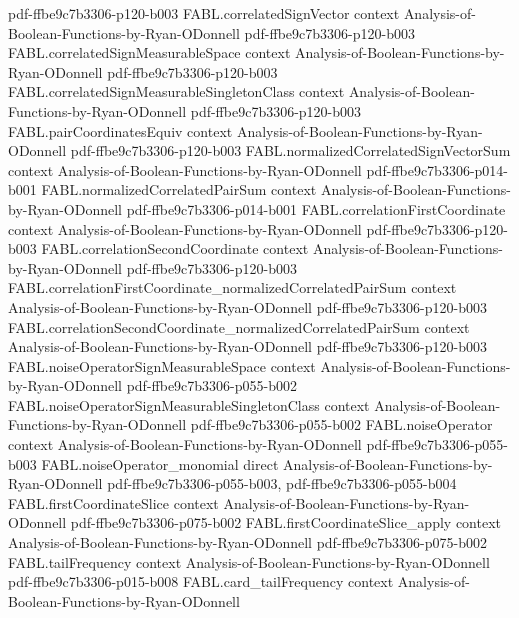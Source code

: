 \begin{theorem}
  {pdf-ffbe9c7b3306-p120-b003}
\proofstep
  {FABL.correlatedSignVector}
  {context}
  {Analysis-of-Boolean-Functions-by-Ryan-ODonnell}
  {pdf-ffbe9c7b3306-p120-b003}
\proofstep
  {FABL.correlatedSignMeasurableSpace}
  {context}
  {Analysis-of-Boolean-Functions-by-Ryan-ODonnell}
  {pdf-ffbe9c7b3306-p120-b003}
\proofstep
  {FABL.correlatedSignMeasurableSingletonClass}
  {context}
  {Analysis-of-Boolean-Functions-by-Ryan-ODonnell}
  {pdf-ffbe9c7b3306-p120-b003}
\proofstep
  {FABL.pairCoordinatesEquiv}
  {context}
  {Analysis-of-Boolean-Functions-by-Ryan-ODonnell}
  {pdf-ffbe9c7b3306-p120-b003}
\proofstep
  {FABL.normalizedCorrelatedSignVectorSum}
  {context}
  {Analysis-of-Boolean-Functions-by-Ryan-ODonnell}
  {pdf-ffbe9c7b3306-p014-b001}
\proofstep
  {FABL.normalizedCorrelatedPairSum}
  {context}
  {Analysis-of-Boolean-Functions-by-Ryan-ODonnell}
  {pdf-ffbe9c7b3306-p014-b001}
\proofstep
  {FABL.correlationFirstCoordinate}
  {context}
  {Analysis-of-Boolean-Functions-by-Ryan-ODonnell}
  {pdf-ffbe9c7b3306-p120-b003}
\proofstep
  {FABL.correlationSecondCoordinate}
  {context}
  {Analysis-of-Boolean-Functions-by-Ryan-ODonnell}
  {pdf-ffbe9c7b3306-p120-b003}
\proofstep
  {FABL.correlationFirstCoordinate_normalizedCorrelatedPairSum}
  {context}
  {Analysis-of-Boolean-Functions-by-Ryan-ODonnell}
  {pdf-ffbe9c7b3306-p120-b003}
\proofstep
  {FABL.correlationSecondCoordinate_normalizedCorrelatedPairSum}
  {context}
  {Analysis-of-Boolean-Functions-by-Ryan-ODonnell}
  {pdf-ffbe9c7b3306-p120-b003}
\proofstep
  {FABL.noiseOperatorSignMeasurableSpace}
  {context}
  {Analysis-of-Boolean-Functions-by-Ryan-ODonnell}
  {pdf-ffbe9c7b3306-p055-b002}
\proofstep
  {FABL.noiseOperatorSignMeasurableSingletonClass}
  {context}
  {Analysis-of-Boolean-Functions-by-Ryan-ODonnell}
  {pdf-ffbe9c7b3306-p055-b002}
\proofstep
  {FABL.noiseOperator}
  {context}
  {Analysis-of-Boolean-Functions-by-Ryan-ODonnell}
  {pdf-ffbe9c7b3306-p055-b003}
\proofstep
  {FABL.noiseOperator_monomial}
  {direct}
  {Analysis-of-Boolean-Functions-by-Ryan-ODonnell}
  {pdf-ffbe9c7b3306-p055-b003,
    pdf-ffbe9c7b3306-p055-b004}
\proofstep
  {FABL.firstCoordinateSlice}
  {context}
  {Analysis-of-Boolean-Functions-by-Ryan-ODonnell}
  {pdf-ffbe9c7b3306-p075-b002}
\proofstep
  {FABL.firstCoordinateSlice_apply}
  {context}
  {Analysis-of-Boolean-Functions-by-Ryan-ODonnell}
  {pdf-ffbe9c7b3306-p075-b002}
\proofstep
  {FABL.tailFrequency}
  {context}
  {Analysis-of-Boolean-Functions-by-Ryan-ODonnell}
  {pdf-ffbe9c7b3306-p015-b008}
\proofstep
  {FABL.card_tailFrequency}
  {context}
  {Analysis-of-Boolean-Functions-by-Ryan-ODonnell}

\end{theorem}
